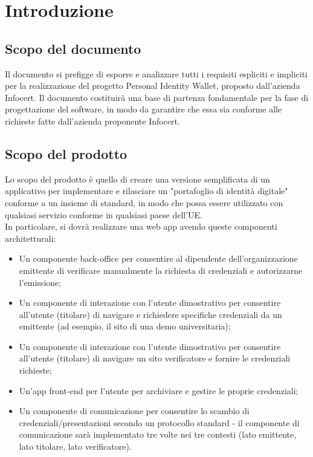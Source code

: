 \section{Introduzione}

\subsection{Scopo del documento}
Il documento si prefigge di esporre e analizzare tutti i requisiti espliciti e impliciti per la realizzazione del progetto Personal Identity Wallet\glo, proposto dall'azienda Infocert. 
Il documento costituirà una base di partenza fondamentale per la fase di progettazione del software, in modo da garantire che essa sia conforme alle richieste fatte dall'azienda 
proponente Infocert.


\subsection{Scopo del prodotto}
Lo scopo del prodotto è quello di creare una versione semplificata di un applicativo per implementare e rilasciare un "portafoglio di identità digitale" conforme a un insieme di 
standard, in modo che possa essere utilizzato con qualsiasi servizio conforme in qualsiasi paese dell'UE. \\
In particolare, si dovrà realizzare una web app\glo{} avendo queste componenti architetturali:
\begin{itemize}
    \item Un componente back-office per consentire al dipendente dell'organizzazione emittente di verificare\glo{} manualmente la richiesta di credenziali e autorizzarne l'emissione; 
    \item Un componente di interazione con l'utente dimostrativo per consentire all'utente (titolare) di navigare e richiedere specifiche credenziali da un emittente 
(ad esempio, il sito di una demo universitaria); 
    \item Un componente di interazione con l'utente dimostrativo per consentire all'utente (titolare) di navigare un sito verificatore\glo{} e fornire le credenziali richieste;
    \item Un'app front-end per l'utente per archiviare e gestire le proprie credenziali; 
    \item Un componente di comunicazione per consentire lo scambio di credenziali/presentazioni secondo un protocollo standard - il componente di comunicazione sarà implementato 
tre volte nei tre contesti (lato emittente, lato titolare, lato verificatore).
\end{itemize}

